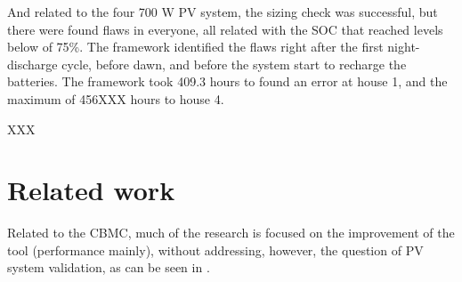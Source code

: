 \documentclass[journal]{IEEEtran}
\begin{document}
And related to the four 700 W PV system, the sizing check was successful, but there were  found flaws in everyone, all related with the SOC that reached levels below of 75\%. The framework identified the flaws right after the first night-discharge cycle, before dawn, and before the system start to recharge the batteries. The framework took 409.3 hours to found an error at house 1, and the maximum of 456XXX hours to house 4.  

%
%
%

XXX

\section{Related work }
Related to the CBMC, much of the research is focused on the improvement of the tool (performance mainly), without addressing, however, the question of PV system validation, as can be seen in \cite{Kroening}.
\end{document}
